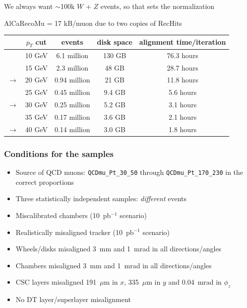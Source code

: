 \documentclass[compress]{beamer}
\begin{document}
\begin{frame}
\begin{center}
\small
We always want $\sim$100k $W$ + $Z$ events, so that sets the normalization

AlCaRecoMu = 17 kB/muon due to two copies of RecHits

\begin{tabular}{c c c c c}
\hline\hline & $p_T$ cut & events & disk space & alignment time/iteration \\\hline
& 10 GeV & 6.1 million & 130 GB & 76.3 hours \\
& 15 GeV & 2.3 million & 48 GB & 28.7 hours \\
$\to$ & 20 GeV & 0.94 million & 21 GB & 11.8 hours \\
& 25 GeV & 0.45 million & 9.4 GB & 5.6 hours \\
$\to$ & 30 GeV & 0.25 million & 5.2 GB & 3.1 hours \\
& 35 GeV & 0.17 million & 3.6 GB & 2.1 hours \\
$\to$ & 40 GeV & 0.14 million & 3.0 GB & 1.8 hours \\\hline\hline
\end{tabular}
\end{center}
\end{frame}

\begin{frame}
\frametitle{Conditions for the samples}
\begin{itemize}\setlength{\itemsep}{0.25 cm}
\item Source of QCD muons: {\tt QCDmu\_Pt\_30\_50} through {\tt QCDmu\_Pt\_170\_230} in the correct proportions
\item Three statistically independent samples: {\it different} events
\item Miscalibrated chambers (10~pb$^{-1}$ scenario)
\item Realistically misaligned tracker (10~pb$^{-1}$ scenario)
\item Wheels/disks misaligned 3~mm and 1~mrad in all directions/angles
\item Chambers misaligned 3~mm and 1~mrad in all directions/angles
\item CSC layers misaligned 191~$\mu$m in $x$, 335~$\mu$m in $y$ and 0.04~mrad in $\phi_z$
\item No DT layer/superlayer misalignment
\end{itemize}
\end{frame}
\end{document}
